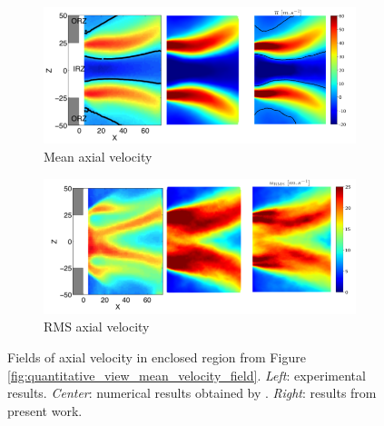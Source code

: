 \begin{figure}
\centering
\begin{subfigure}[b]{1.0\textwidth}
	\centering
   \includegraphics[scale=1.0]{./part3_applications/figures_ch7_aero/validation_qualitative_u_mean}
   \caption{Mean axial velocity}
   \label{fig:validation_qualitative_u_mean} 
\end{subfigure}
\begin{subfigure}[b]{1.0\textwidth}
	\centering
   \includegraphics[scale=1.0]{./part3_applications/figures_ch7_aero/validation_qualitative_u_rms}
   \caption{RMS axial velocity}
   \label{fig:validation_qualitative_u_rms}
\end{subfigure}
\caption{Fields of axial velocity in enclosed region from Figure \ref{fig:quantitative_view_mean_velocity_field}. \textsl{Left}: experimental results. \textsl{Center}: numerical results obtained by . \textsl{Right}: results from present work.}
\label{fig:validation_qualitative_u}
\end{figure}

